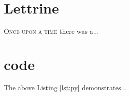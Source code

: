 \section{Lettrine}
\lettrine{O}{nce upon a time} there was a...


\section{code}



The above Listing \ref{lst:py} demonstrates...
